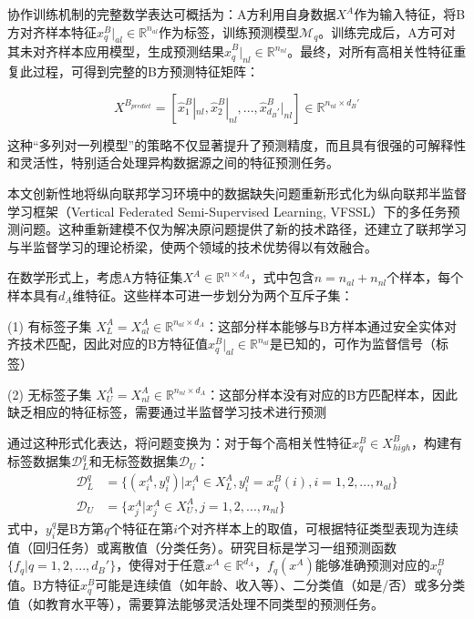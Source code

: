协作训练机制的完整数学表达可概括为：A方利用自身数据$X^A$作为输入特征，将B方对齐样本特征$x^B_q|_{al} \in \mathbb{R}^{n_{al}}$作为标签，训练预测模型$\mathcal{M}_q$。训练完成后，A方可对其未对齐样本应用模型，生成预测结果$\hat{x}^B_q|_{nl} \in \mathbb{R}^{n_{nl}}$。最终，对所有高相关性特征重复此过程，可得到完整的B方预测特征矩阵：

\begin{equation}
	X^{B_{predict}} = [\hat{x}^B_1|_{nl}, \hat{x}^B_2|_{nl}, ..., \hat{x}^B_{d_B'}|_{nl}] \in \mathbb{R}^{n_{nl} \times d_B'}
\end{equation}

这种“多列对一列模型”的策略不仅显著提升了预测精度，而且具有很强的可解释性和灵活性，特别适合处理异构数据源之间的特征预测任务。

本文创新性地将纵向联邦学习环境中的数据缺失问题重新形式化为纵向联邦半监督学习框架（Vertical Federated Semi-Supervised Learning, VFSSL）下的多任务预测问题。这种重新建模不仅为解决原问题提供了新的技术路径，还建立了联邦学习与半监督学习的理论桥梁，使两个领域的技术优势得以有效融合。

在数学形式上，考虑A方特征集$X^A \in \mathbb{R}^{n \times d_A}$，式中包含$n = n_{al} + n_{nl}$个样本，每个样本具有$d_A$维特征。这些样本可进一步划分为两个互斥子集：

(1) 有标签子集 $X^A_{L} = X^A_{al} \in \mathbb{R}^{n_{al} \times d_A}$：这部分样本能够与B方样本通过安全实体对齐技术匹配，因此对应的B方特征值$x^B_q|_{al} \in \mathbb{R}^{n_{al}}$是已知的，可作为监督信号（标签）

(2) 无标签子集 $X^A_{U} = X^A_{nl} \in \mathbb{R}^{n_{nl} \times d_A}$：这部分样本没有对应的B方匹配样本，因此缺乏相应的特征标签，需要通过半监督学习技术进行预测

通过这种形式化表达，将问题变换为：对于每个高相关性特征$x^B_q \in X^B_{high}$，构建有标签数据集$\mathcal{D}_L^q$和无标签数据集$\mathcal{D}_U$：
\begin{equation}
	\begin{split}
		\mathcal{D}_{L}^{q} &= \{(x_{i}^{A},y_{i}^{q})|x_{i}^{A}\in X_{L}^{A},y_{i}^{q}=x_{q}^{B}(i),i=1,2,...,{{n}_{al}}\} \\
		{{\mathcal{D}}}_{U} &= \{x_{j}^{A}|x_{j}^{A}\in X_{U}^{A},j=1,2,...,{{n}_{nl}}\}
	\end{split}
\end{equation}
式中，$y_i^q$是B方第$q$个特征在第$i$个对齐样本上的取值，可根据特征类型表现为连续值（回归任务）或离散值（分类任务）。研究目标是学习一组预测函数$\{f_q | q = 1,2,...,d_B'\}$，使得对于任意$x^A \in \mathbb{R}^{d_A}$，$f_q(x^A)$能够准确预测对应的$x^B_q$值。B方特征$x^B_q$可能是连续值（如年龄、收入等）、二分类值（如是/否）或多分类值（如教育水平等），需要算法能够灵活处理不同类型的预测任务。


